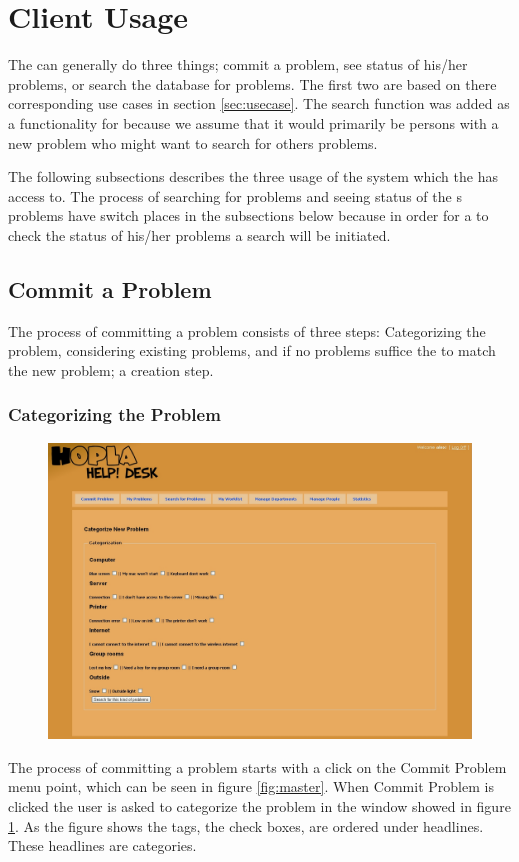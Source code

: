 \section{Client Usage}
\label{sec:client_usage}
The \aclient[] can generally do three things; commit a problem, see status of his/her problems, or search the database for problems.
The first two are based on there corresponding use cases in section \ref{sec:usecase}.
The search function was added as a functionality for \aclient[] because we assume that it would primarily be persons with a new problem who might want to search for others problems.

The following subsections describes the three usage of the system which the \aclient[] has access to.
The process of searching for problems and seeing status of the \aclient[]s problems have switch places in the subsections below because in order for a \aclient[] to check the status of his/her problems a search will be initiated.

\subsection{Commit a Problem}
\label{sub:commit}
The process of committing a problem consists of three steps: Categorizing the problem, considering existing problems, and if no problems suffice the to match the new problem; a creation step.

\subsubsection{Categorizing the Problem}
\begin{figure}[htb]
	\centering
		\includegraphics[width=1.00\textwidth, clip=true, trim=2.9cm 0.5cm 15cm 8cm]{input/implementation/program_presentation/commit.png}
	\label{fig:commit}
\end{figure}
The process of committing a problem starts with a click on the Commit Problem menu point, which can be seen in figure \ref{fig:master}.
When Commit Problem is clicked the user is asked to categorize the problem in the window showed in figure \ref{fig:commit}.
As the figure shows the tags, the check boxes, are ordered under headlines.
These headlines are categories.

